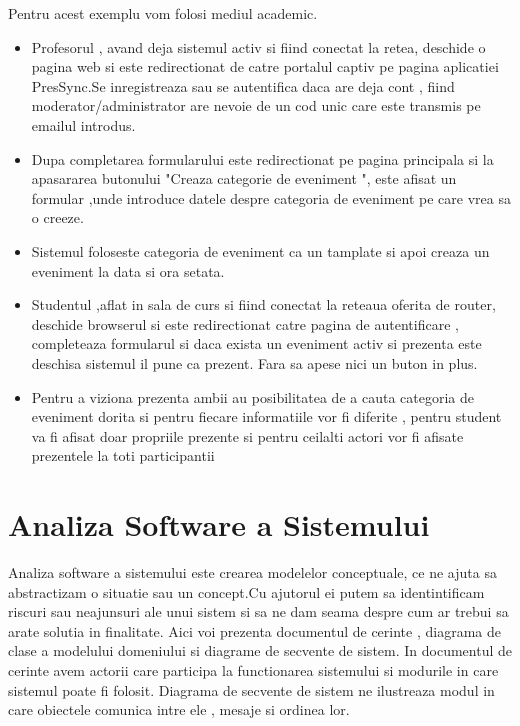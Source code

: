 \documentclass[11pt]{article}
\begin{document}
Pentru acest exemplu vom folosi mediul academic.
\begin{itemize}
    \item Profesorul , avand deja sistemul activ si fiind conectat la retea, deschide o pagina web si este redirectionat de catre portalul captiv pe pagina aplicatiei PresSync.Se inregistreaza sau se autentifica daca are deja cont , fiind moderator/administrator are nevoie de un cod unic care este transmis pe emailul introdus.

    \item Dupa completarea formularului este redirectionat pe pagina principala si la apasararea butonului "Creaza categorie de eveniment ", este afisat un formular ,unde introduce datele despre categoria de eveniment pe care vrea sa o creeze.

    \item Sistemul foloseste categoria de eveniment ca un tamplate si apoi creaza un eveniment la data si ora setata.

    \item Studentul ,aflat in sala de curs si fiind conectat la reteaua oferita de router, deschide browserul si este redirectionat catre pagina de autentificare , completeaza formularul si daca exista un eveniment activ si prezenta este deschisa sistemul il pune ca prezent.
Fara sa apese nici un buton in plus.

\item Pentru a viziona prezenta ambii au posibilitatea de a cauta categoria de eveniment dorita si pentru fiecare informatiile vor fi diferite , pentru student va fi afisat doar propriile prezente si pentru ceilalti actori vor fi afisate prezentele la toti participantii

\end{itemize}

\section{Analiza Software a Sistemului}

    Analiza software a
    sistemului este crearea modelelor conceptuale, ce ne ajuta sa abstractizam o situatie sau un concept.Cu ajutorul ei putem sa identintificam riscuri sau neajunsuri ale unui sistem si sa ne dam seama despre cum ar trebui sa arate solutia in finalitate.
    Aici voi prezenta documentul de cerinte , diagrama de clase a modelului domeniului si diagrame de secvente de sistem.
    In documentul de cerinte avem actorii care participa la functionarea sistemului si modurile in care sistemul poate fi folosit.
    Diagrama de secvente de sistem ne ilustreaza modul in care obiectele comunica intre ele , mesaje si ordinea lor.
\end{document}

